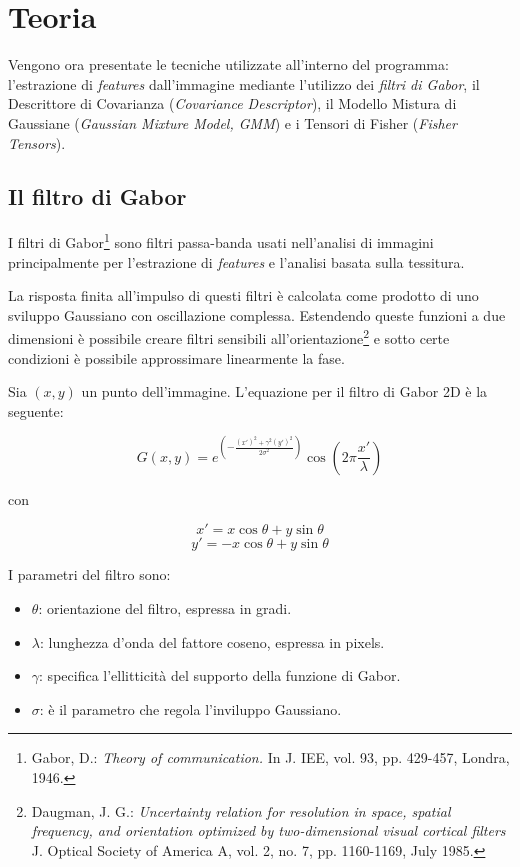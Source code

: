 \section{Teoria}

Vengono ora presentate le tecniche utilizzate all'interno del programma: l'estrazione di \emph{features} dall'immagine mediante l'utilizzo dei \emph{filtri di Gabor}, il Descrittore di Covarianza (\emph{Covariance Descriptor}), il Modello Mistura di Gaussiane (\emph{Gaussian Mixture Model, GMM}) e i Tensori di Fisher (\emph{Fisher Tensors}).

\subsection{Il filtro di Gabor}

I filtri di Gabor\footnote{Gabor, D.: \emph{Theory of communication.} In J. IEE, vol. 93, pp. 429-457, Londra, 1946.} sono filtri passa-banda usati nell'analisi di immagini principalmente per l'estrazione di \emph{features} e l'analisi basata sulla tessitura.

La risposta finita all'impulso di questi filtri è calcolata come prodotto di uno sviluppo Gaussiano con oscillazione complessa. Estendendo queste funzioni a due dimensioni è possibile creare filtri sensibili all'orientazione\footnote{Daugman, J. G.: \emph{Uncertainty relation for resolution in space, spatial frequency, and orientation optimized by two-dimensional visual cortical filters} J. Optical Society of America A, vol. 2, no. 7, pp. 1160-1169, July 1985.} e sotto certe condizioni è possibile approssimare linearmente la fase.

Sia $(x, y)$ un punto dell'immagine. L'equazione per il filtro di Gabor 2D è la seguente:

$$G(x, y) = e^{(- \frac{(x')^2 + \gamma^2 (y')^2}{2 \sigma^2})} \cos (2 \pi \frac{x'}{\lambda})  $$ 

con 

$$x' = x \cos \theta + y \sin \theta$$
$$y' = - x \cos \theta + y \sin \theta$$

I parametri del filtro sono:
\begin{itemize}
\item $\theta$: orientazione del filtro, espressa in gradi.
\item $\lambda$: lunghezza d'onda del fattore coseno, espressa in pixels.
\item $\gamma$: specifica l'ellitticità del supporto della funzione di Gabor.
\item $\sigma$: è il parametro che regola l'inviluppo Gaussiano.
\end{itemize}

